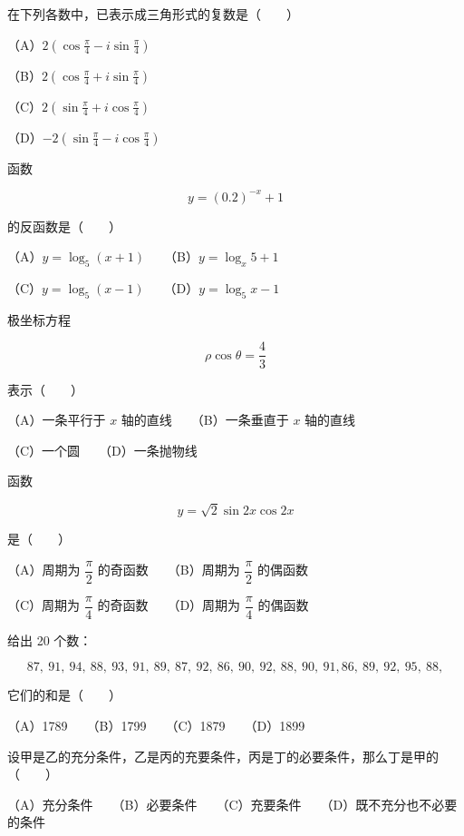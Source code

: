 \begin{question}
在下列各数中，已表示成三角形式的复数是\mbox{（　　）}

（A）$2\left(\cos\frac\pi4-i\sin\frac\pi4\right)$

（B）$2\left(\cos\frac\pi4+i\sin\frac\pi4\right)$

（C）$2\left(\sin\frac\pi4+i\cos\frac\pi4\right)$

（D）$-2\left(\sin\frac\pi4-i\cos\frac\pi4\right)$

\end{question}
\begin{question}
函数

\nopagebreak[4]
\[
y=(0.2)^{-x}+1
\]

的反函数是\mbox{（　　）}

（A）$y=\log_5(x+1)$　　（B）$y=\log_x5+1$

（C）$y=\log_5(x-1)$　　（D）$y=\log_5x-1$

\end{question}
\begin{question}
极坐标方程

\nopagebreak[4]
\[
\rho\cos\theta=\frac43
\]

表示\mbox{（　　）}

（A）一条平行于 $x$ 轴的直线　　（B）一条垂直于 $x$ 轴的直线

（C）一个圆　　（D）一条抛物线

\end{question}
\begin{question}
函数

\nopagebreak[4]
\[
y=\sqrt2\sin2x\cos2x
\]

是\mbox{（　　）}

（A）周期为 $\dfrac\pi2$ 的奇函数　　（B）周期为 $\dfrac\pi2$ 的偶函数

（C）周期为 $\dfrac\pi4$ 的奇函数　　（D）周期为 $\dfrac\pi4$ 的偶函数

\end{question}
\begin{question}
给出 20 个数：

\nopagebreak[4]
\[
87,\ 91,\ 94,\ 88,\ 93,\ 91,\ 89,\ 87,\ 92,\ 86,\ 90,\ 92,\ 88,\ 90,\ 91,
86,\ 89,\ 92,\ 95,\ 88,
\]

它们的和是\mbox{（　　）}

（A）1789　　（B）1799　　（C）1879　　（D）1899

\end{question}
\begin{question}
设甲是乙的充分条件，乙是丙的充要条件，丙是丁的必要条件，那么丁是甲的\mbox{（　　）}

（A）充分条件　　（B）必要条件　　（C）充要条件　　（D）既不充分也不必要的条件

\end{question}
